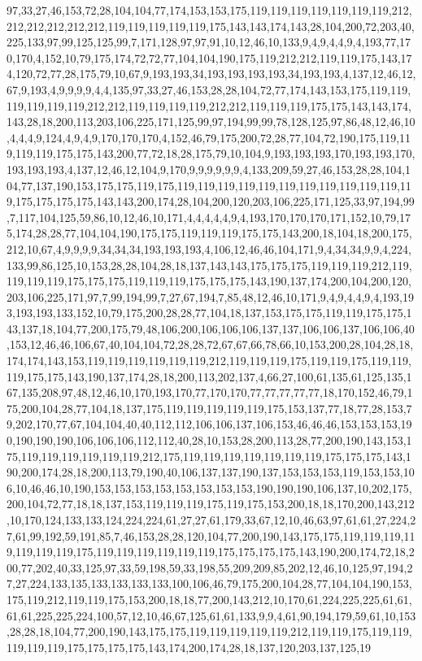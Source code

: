 97,33,27,46,153,72,28,104,104,77,174,153,153,175,119,119,119,119,119,119,119,212,212,212,212,212,212,119,119,119,119,119,175,143,143,174,143,28,104,200,72,203,40,225,133,97,99,125,125,99,7,171,128,97,97,91,10,12,46,10,133,9,4,9,4,4,9,4,193,77,170,170,4,152,10,79,175,174,72,72,77,104,104,190,175,119,212,212,119,119,175,143,174,120,72,77,28,175,79,10,67,9,193,193,34,193,193,193,193,34,193,193,4,137,12,46,12,67,9,193,4,9,9,9,9,4,4,135,97,33,27,46,153,28,28,104,72,77,174,143,153,175,119,119,119,119,119,119,212,212,119,119,119,119,212,212,119,119,119,175,175,143,143,174,143,28,18,200,113,203,106,225,171,125,99,97,194,99,99,78,128,125,97,86,48,12,46,10,4,4,4,9,124,4,9,4,9,170,170,170,4,152,46,79,175,200,72,28,77,104,72,190,175,119,119,119,119,175,175,143,200,77,72,18,28,175,79,10,104,9,193,193,193,170,193,193,170,193,193,193,4,137,12,46,12,104,9,170,9,9,9,9,9,9,4,133,209,59,27,46,153,28,28,104,104,77,137,190,153,175,175,119,175,119,119,119,119,119,119,119,119,119,119,119,119,175,175,175,175,143,143,200,174,28,104,200,120,203,106,225,171,125,33,97,194,99,7,117,104,125,59,86,10,12,46,10,171,4,4,4,4,4,9,4,193,170,170,170,171,152,10,79,175,174,28,28,77,104,104,190,175,175,119,119,119,175,175,143,200,18,104,18,200,175,212,10,67,4,9,9,9,9,34,34,34,193,193,193,4,106,12,46,46,104,171,9,4,34,34,9,9,4,224,133,99,86,125,10,153,28,28,104,28,18,137,143,143,175,175,175,119,119,119,212,119,119,119,119,175,175,175,119,119,119,175,175,175,143,190,137,174,200,104,200,120,203,106,225,171,97,7,99,194,99,7,27,67,194,7,85,48,12,46,10,171,9,4,9,4,4,9,4,193,193,193,193,133,152,10,79,175,200,28,28,77,104,18,137,153,175,175,119,119,175,175,143,137,18,104,77,200,175,79,48,106,200,106,106,106,137,137,106,106,137,106,106,40,153,12,46,46,106,67,40,104,104,72,28,28,72,67,67,66,78,66,10,153,200,28,104,28,18,174,174,143,153,119,119,119,119,119,119,212,119,119,119,175,119,119,175,119,119,119,175,175,143,190,137,174,28,18,200,113,202,137,4,66,27,100,61,135,61,125,135,167,135,208,97,48,12,46,10,170,193,170,77,170,170,77,77,77,77,77,18,170,152,46,79,175,200,104,28,77,104,18,137,175,119,119,119,119,119,175,153,137,77,18,77,28,153,79,202,170,77,67,104,104,40,40,112,112,106,106,137,106,153,46,46,46,153,153,153,190,190,190,190,106,106,106,112,112,40,28,10,153,28,200,113,28,77,200,190,143,153,175,119,119,119,119,119,119,212,175,119,119,119,119,119,119,119,175,175,175,143,190,200,174,28,18,200,113,79,190,40,106,137,137,190,137,153,153,153,119,153,153,106,10,46,46,10,190,153,153,153,153,153,153,153,153,190,190,190,106,137,10,202,175,200,104,72,77,18,18,137,153,119,119,119,175,119,175,153,200,18,18,170,200,143,212,10,170,124,133,133,124,224,224,61,27,27,61,179,33,67,12,10,46,63,97,61,61,27,224,27,61,99,192,59,191,85,7,46,153,28,28,120,104,77,200,190,143,175,175,119,119,119,119,119,119,119,175,119,119,119,119,119,119,175,175,175,175,143,190,200,174,72,18,200,77,202,40,33,125,97,33,59,198,59,33,198,55,209,209,85,202,12,46,10,125,97,194,27,27,224,133,135,133,133,133,133,100,106,46,79,175,200,104,28,77,104,104,190,153,175,119,212,119,119,175,153,200,18,18,77,200,143,212,10,170,61,224,225,225,61,61,61,61,225,225,224,100,57,12,10,46,67,125,61,61,133,9,9,4,61,90,194,179,59,61,10,153,28,28,18,104,77,200,190,143,175,175,119,119,119,119,119,212,119,119,175,119,119,119,119,119,175,175,175,175,143,174,200,174,28,18,137,120,203,137,125,19